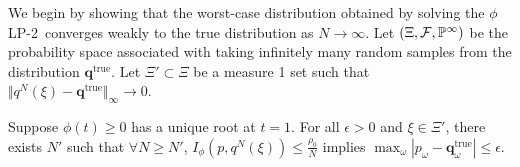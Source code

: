 \documentclass[opre,nonblindrev]{informs3} %
\renewcommand{\P}{\mathbb{P}}
\newcommand{\q}{\mathbf{q}}
\newcommand{\qtrue}{\q^{\text{true}}}
\newcommand{\plp}{$\phi$LP-2}
\begin{document}
We begin by showing that the worst-case distribution obtained by solving the \plp\ converges weakly to the true distribution as $N \rightarrow \infty$.
Let $(\Xi,{\cal F},\P^\infty)$ be the probability space associated with taking infinitely many random samples from the distribution $\qtrue$.
Let $\Xi' \subset \Xi$ be a measure 1 set such that $\Vert q^N(\xi) - \qtrue \Vert_\infty \rightarrow 0$.

\begin{proposition} \label{prop:weak_conv}
	Suppose $\phi(t) \geq 0$ has a unique root at $t = 1$.
	For all $\epsilon > 0$ and $\xi \in \Xi'$, there exists $N'$ such that $\forall N \geq N'$, $I_{\phi}(p,q^N(\xi)) \leq \frac{\rho_0}{N}$ implies $\max_\omega |p_\omega - \qtrue_\omega| \leq \epsilon$.
\end{proposition}
\end{document}
